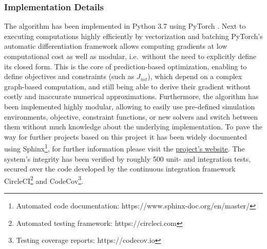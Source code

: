 
\subsubsection{Implementation Details} 
The algorithm has been implemented in Python 3.7 using PyTorch \cite{pytorch}. Next to executing computations highly efficiently by vectorization and batching PyTorch's automatic differentiation framework allows computing gradients at low computational cost as well as modular, i.e.\ without the need to explicitly define its closed form. This is the core of prediction-based optimization, enabling to define objectives and constraints (such as $J_{int}$), which depend on a complex graph-based computation, and still being able to derive their gradient without costly and inaccurate numerical approximations. 
\newline 
Furthermore, the algorithm has been implemented highly modular, allowing to easily use pre-defined simulation environments, objective, constraint functions, or new solvers and switch between them without much knowledge about the underlying implementation. To pave the way for further projects based on this project it has been widely documented using Sphinx\footnote{Automated code documentation: https://www.sphinx-doc.org/en/master/}, for further information please visit the \href{https://simon-schaefer.github.io/mantrap/}{project's website}.  
\newline
The system's integrity has been verified by roughly 500 unit- and integration tests, secured over the code developed by the continuous integration framework CircleCI\footnote{Automated testing framework: https://circleci.com} and CodeCov\footnote{Testing coverage reports: https://codecov.io}.
